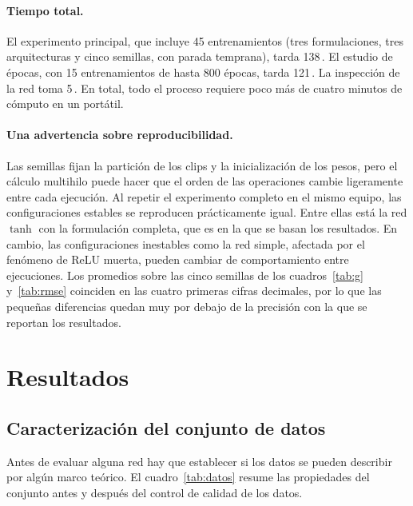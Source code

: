 \documentclass[titlepage,11pt]{article}
\providecommand{\SI}[2]{#1\,#2}
\begin{document}
\paragraph{Tiempo total.} El experimento principal, que incluye 45 entrenamientos (tres formulaciones, tres arquitecturas y cinco semillas, con parada temprana), tarda \SI{138}{\second}. El estudio de épocas, con 15 entrenamientos de hasta 800 épocas, tarda \SI{121}{\second}. La inspección de la red toma \SI{5}{\second}. En total, todo el proceso requiere poco más de cuatro minutos de cómputo en un portátil.


\paragraph{Una advertencia sobre reproducibilidad.} Las semillas fijan la partición de los clips y la inicialización de los pesos, pero el cálculo multihilo puede hacer que el orden de las operaciones cambie ligeramente entre cada ejecución. Al repetir el experimento completo en el mismo equipo, las configuraciones estables se reproducen prácticamente igual. Entre ellas está la red $\tanh$ con la formulación completa, que es en la que se basan los resultados. En cambio, las configuraciones inestables como la red simple, afectada por el fenómeno de ReLU muerta, pueden cambiar de comportamiento entre ejecuciones. Los promedios sobre las cinco semillas de los cuadros~\ref{tab:g} y~\ref{tab:rmse} coinciden en las cuatro primeras cifras decimales, por lo que las pequeñas diferencias quedan muy por debajo de la precisión con la que se reportan los resultados.


\section{Resultados}
\label{sec:resultados}

\subsection{Caracterización del conjunto de datos}
\label{subsec:datos_res}

Antes de evaluar alguna red hay que establecer si los datos se pueden describir por algún marco teórico. El
cuadro~\ref{tab:datos} resume las propiedades del conjunto antes y después del control de calidad de los datos.
\end{document}
